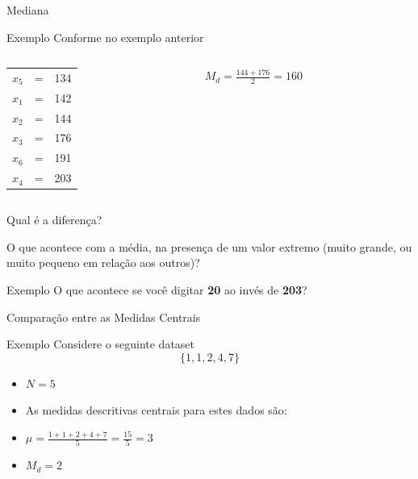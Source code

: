 \documentclass{beamer}
\begin{document}
\begin{frame}{\scriptsize Mediana}
  \begin{exampleblock}{Exemplo}
    \footnotesize
Conforme no exemplo anterior
    \begin{columns}
      \begin{column}{5cm}
        \begin{tabular}{ccc}
          $x_5$ &=&134\\
          $x_1$ &=&142\\
          $x_2$ &=&\alert{144}\\
          $x_3$ &=&\alert{176}\\
          $x_6$ &=&191\\
          $x_4$ &=&203\\
        \end{tabular}
      \end{column}
      \begin{column}{5cm}
        $M_d = \frac{144+176}{2}=160$
      \end{column}
    \end{columns}
  \end{exampleblock}
\end{frame}

\begin{frame}{\scriptsize Qual é a diferença?}
  \begin{block}{}
    \footnotesize
    O que acontece com a média, na presença de um valor extremo (muito grande, ou muito pequeno em relação aos outros)?
  \end{block}
  \begin{exampleblock}{Exemplo}
    \footnotesize
    O que acontece se você digitar {\bf 20} ao invés de {\bf 203}?
  \end{exampleblock}
\end{frame}

\begin{frame}{\scriptsize Comparação entre as Medidas Centrais}
  \begin{exampleblock}{Exemplo}
    \footnotesize
    Considere o seguinte dataset $$\{ 1,1,2,4,7\}$$
  \begin{itemize}
    \footnotesize
  \item $N=5$
  \item As medidas descritivas centrais para estes dados são:
  \item $\mu = \frac{1+1+2+4+7}{5} = \frac{15}{5}= 3$
  \item $M_d = 2$
  \end{itemize}
\end{exampleblock}
\end{frame}
\end{document}
